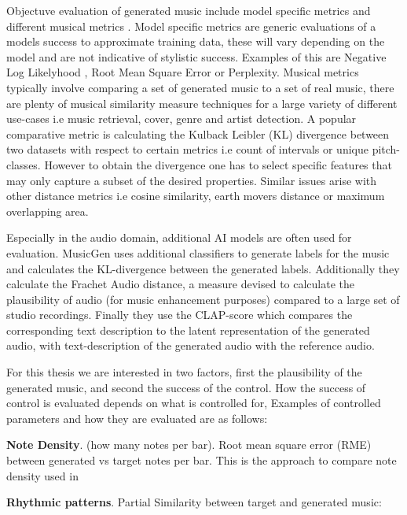 Objectuve evaluation of generated music include model specific metrics and different musical metrics \cite{Xiong_Wang_ai_eval_methods_2023}. Model specific metrics are generic evaluations of a models success to approximate training data, these will vary depending on the model and are not indicative of stylistic success. Examples of this are Negative Log Likelyhood \cite{Huang_Vaswani_Uszkoreit_Shazeer_Simon_Hawthorne_Dai_Hoffman_Dinculescu_Eck_2018}, Root Mean Square Error \cite{Rütte_figaro_2023} or Perplexity\cite{Rütte_figaro_2023}. Musical metrics typically involve comparing a set of generated music to a set of real music, there are plenty of musical similarity measure techniques\cite{Gurjar_Moon_similarity_2018} for a large variety of different use-cases i.e music retrieval, cover, genre and artist detection. A popular comparative metric is calculating the Kulback Leibler (KL) divergence between two datasets with respect to certain metrics i.e count of intervals or unique pitch-classes. However to obtain the divergence one has to select specific features that may only capture a subset of the desired properties. Similar issues arise with other distance metrics i.e cosine similarity, earth movers distance or maximum overlapping area. 

Especially in the audio domain, additional AI models are often used for evaluation. MusicGen \cite{copet2023simple} uses additional classifiers to generate labels for the music and calculates the KL-divergence between the generated labels. Additionally they calculate the Frachet Audio distance, a measure devised to calculate the plausibility of audio (for music enhancement purposes) compared to a large set of studio recordings\cite{Kilgour_Frachet_2019}. Finally they use the CLAP-score which compares the corresponding text description to the latent representation of the generated audio, with text-description of the generated audio with the reference audio. \cite{Elizalde_Deshmukh_Ismail_Wang_2023}

For this thesis we are interested in two factors, first the plausibility of the generated music, and second the success of the control. How the success of control is evaluated depends on what is controlled for,  Examples of controlled parameters and how they are evaluated are as follows:

\textbf{Note Density}.  (how many notes per bar). Root mean square error (RME) between generated vs target notes per bar. This is the approach to compare note density used in \cite{Rütte_figaro_2023}

\textbf{Rhythmic patterns}. Partial Similarity \cite{Volk_Garbers_VanKranenburg_Wiering_Grijp_Veltkamp_2009} between target and generated music: 

